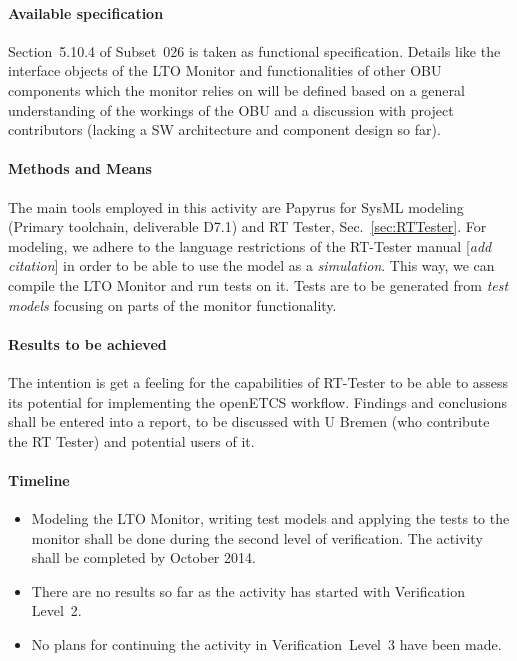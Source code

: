 \paragraph{Available specification}
Section~5.10.4 of Subset~026 is taken as functional
specification. Details like the interface objects of the LTO Monitor
and functionalities of other OBU components which the monitor relies
on will be defined based on a general understanding of the workings of the
OBU and a discussion with project contributors (lacking a SW
architecture and component design so far).

\paragraph{Methods and Means}

The main tools employed in this activity are Papyrus for SysML
modeling (Primary toolchain, deliverable D7.1) and RT Tester,
Sec.~\ref{sec:RTTester}. For modeling, we adhere to the language
restrictions of the RT-Tester manual [\emph{add citation}] in order to
be able to use the model as a \emph{simulation}. This way, we can
compile the LTO Monitor and run tests on it. Tests are to be generated
from \emph{test models} focusing on parts of the monitor
functionality.  

\paragraph{Results to be achieved}

The intention is get a feeling for the capabilities of RT-Tester to be
able to assess its potential for implementing the openETCS
workflow. Findings and conclusions shall be entered into a report, to
be discussed with U Bremen (who contribute the RT Tester) and
potential users of it. 

\paragraph{Timeline}

\begin{itemize}
\item Modeling the LTO Monitor, writing test models and applying the tests
to the monitor shall be done during the second level of
verification. The activity shall be completed by October 2014.
\item There are no results so far as the activity has started with
Verification Level~2.
\item No plans for continuing the activity in Verification~Level~3 have been
made. 
\end{itemize}






